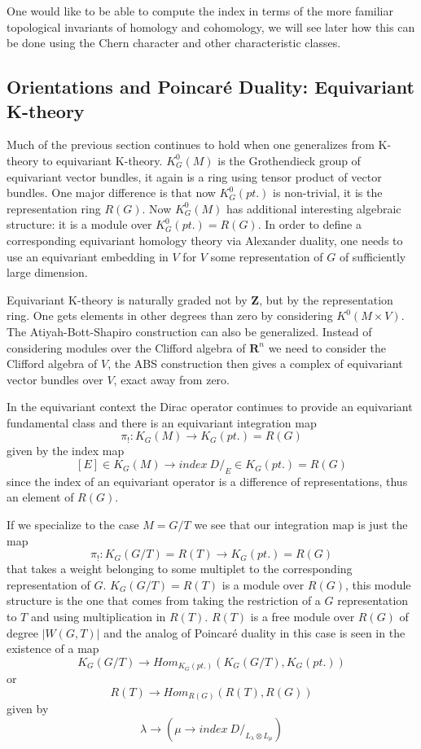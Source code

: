 \documentclass[a4paper,a4paper]{article}
\theoremstyle{conjecture}
\def\Slash#1{#1\!\!\!\!/}
\def\Dirac{\Slash D}
\begin{document}
One would like to be able to compute the index in terms of the more
familiar topological invariants of homology and cohomology, we will see later
how this can be done using the Chern character and other characteristic
classes.

\subsection {Orientations and Poincar\'e Duality: Equivariant K-theory}

Much of the previous section continues to hold when one generalizes from K-theory to equivariant K-theory.  
$K^0_G(M)$ is the Grothendieck group of equivariant vector bundles, it again is a ring using tensor product of
vector bundles.  One major difference is that now $K_G^0(pt.)$ is non-trivial, it is the representation ring
$R(G)$.  Now $K^0_G(M)$ has additional interesting algebraic structure: it is a module over $K_G^0(pt.)=R(G)$.
In order to define a corresponding equivariant homology theory via Alexander duality, one needs to use
an equivariant embedding in $V$ for $V$ some representation of $G$ of sufficiently large dimension.

Equivariant K-theory is naturally graded not by $\mathbf Z$, but by the representation ring. One gets elements
in other degrees than zero by considering $K^0(M\times V)$. The 
Atiyah-Bott-Shapiro construction can also be generalized. Instead of considering modules over
the Clifford algebra of $\mathbf R^n$ we need to consider the Clifford algebra of $V$, the ABS construction
then gives a complex of equivariant vector bundles over $V$, exact away from zero.   

In the equivariant context the Dirac operator continues to provide an equivariant fundamental class and
there is an equivariant integration map
$$\pi_!:K_G(M)\rightarrow K_G(pt.)=R(G)$$
given by the index map
$$ [E]\in K_G(M)\rightarrow index\ \Dirac _E \in K_G(pt.)=R(G)$$
since the index of an equivariant operator is a difference of representations, thus an element of $R(G)$.

If we specialize to the case $M=G/T$ we see that our integration map is just the map
$$\pi_!:K_G(G/T)=R(T)\rightarrow K_G(pt.)=R(G)$$
that takes a weight belonging to some multiplet to the corresponding representation of $G$.
$K_G(G/T)=R(T)$ is a module over $R(G)$, this module structure is the one that comes from taking
the restriction of a $G$ representation to $T$ and using multiplication in $R(T)$.  $R(T)$ is a free module 
over $R(G)$ of degree $|W(G,T)|$ and the analog of Poincar\'e duality in this case is seen in the
existence of a map
$$K_G(G/T)\rightarrow Hom_{K_G(pt.)}(K_G(G/T),K_G(pt.))$$
or
$$R(T)\rightarrow Hom_{R(G)}(R(T),R(G))$$
given by
$$\lambda\rightarrow (\mu\rightarrow index\ \Dirac_{L_\lambda\otimes L_\mu})$$
\end{document}
